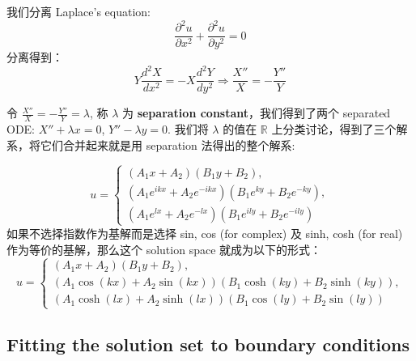 \documentclass[12pt]{article}
\begin{document}
我们分离 Laplace's equation:
$$
\frac{\partial ^2 u}{\partial x ^ 2} + \frac{\partial ^2 u}{\partial y ^ 2} = 0
$$
分离得到：
$$
Y \frac{d^2 X}{dx^2} = -X \frac{d^2 Y}{dy^2} \Rightarrow  \frac{X''}{X} = - \frac{Y''}{Y}
$$

令 $\frac{X''}{X} = - \frac{Y''}{Y} = \lambda$, 称 $\lambda$ 为 \textbf{separation constant}，我们得到了两个 separated ODE: $X'' + \lambda x = 0$, $Y'' - \lambda y = 0$.
我们将 $\lambda$ 的值在 $\mathbb{R}$ 上分类讨论，得到了三个解系，将它们合并起来就是用 separation 法得出的整个解系:

\[
u = 
\begin{cases} 
(A_1 x + A_2)(B_1 y + B_2), \\ 
(A_1 e^{ikx} + A_2 e^{-ikx})(B_1 e^{ky} + B_2 e^{-ky}), \\
(A_1 e^{lx} + A_2 e^{-lx})(B_1 e^{ily} + B_2 e^{-ily})
\end{cases}
\]
如果不选择指数作为基解而是选择 sin, cos (for complex) 及 sinh, cosh (for real) 作为等价的基解，那么这个 solution space 就成为以下的形式：
\[
u = 
\begin{cases} 
(A_1 x + A_2)(B_1 y + B_2), \\
(A_1 \cos(kx) + A_2 \sin(kx))(B_1 \cosh(ky) + B_2 \sinh(ky)), \\
(A_1 \cosh(lx) + A_2 \sinh(lx))(B_1 \cos(ly) + B_2 \sin(ly))
\end{cases}
\]


\subsection{Fitting the solution set to boundary conditions}
\end{document}
